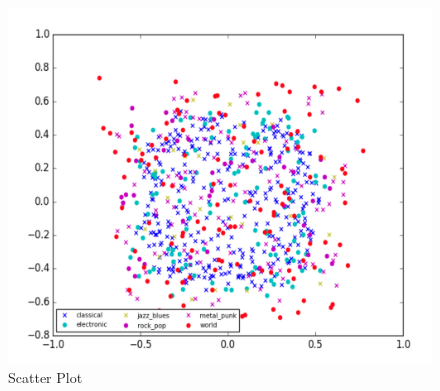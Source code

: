 \documentclass[12pt]{article}
\begin{document}
\begin{figure}[H]\label{emd_scatter}
\center
\includegraphics[scale=0.70]{emd_scatter.png}
\caption{Scatter Plot}
\end{figure}
\end{document}
